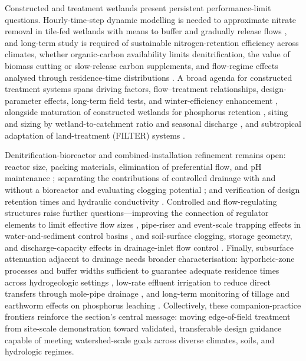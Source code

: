 \documentclass[11pt]{article}
\begin{document}
Constructed and treatment wetlands present persistent performance-limit
questions. Hourly-time-step dynamic modelling is needed to approximate nitrate
removal in tile-fed wetlands with means to buffer and gradually release flows
\parencite{Tanner2011}, and long-term study is required of sustainable
nitrogen-retention efficiency across climates, whether organic-carbon
availability limits denitrification, the value of biomass cutting or slow-release
carbon supplements, and flow-regime effects analysed through residence-time
distributions \parencite{Tanner2005,Tanner2003,Tanner2005b}. A broad agenda for
constructed treatment systems spans driving factors, flow--treatment
relationships, design-parameter effects, long-term field tests, and
winter-efficiency enhancement \parencite{Mendes2021}, alongside maturation of
constructed wetlands for phosphorus retention \parencite{Mendes2020}, siting and
sizing by wetland-to-catchment ratio and seasonal discharge
\parencite{Steidl2019,Tournebize2017}, and subtropical adaptation of
land-treatment (FILTER) systems \parencite{Gardner2001}.

Denitrification-bioreactor and combined-installation refinement remains open:
reactor size, packing materials, elimination of preferential flow, and pH
maintenance \parencite{Aide2016}; separating the contributions of controlled
drainage with and without a bioreactor and evaluating clogging potential
\parencite{Husk2017}; and verification of design retention times and hydraulic
conductivity \parencite{Feyereisen2015}. Controlled and flow-regulating
structures raise further questions---improving the connection of regulator
elements to limit effective flow sizes \parencite{Popek2021}, pipe-riser and
event-scale trapping effects in water-and-sediment control basins
\parencite{Gupta2019}, and soil-surface clogging, storage geometry, and
discharge-capacity effects in drainage-inlet flow control \parencite{Nédélec2010}.
Finally, subsurface attenuation adjacent to drainage needs broader
characterisation: hyporheic-zone processes and buffer widths sufficient to
guarantee adequate residence times across hydrogeologic settings
\parencite{Puckett2005}, low-rate effluent irrigation to reduce direct transfers
through mole-pipe drainage \parencite{Monaghan2007}, and long-term monitoring of
tillage and earthworm effects on phosphorus leaching \parencite{Ulén2018}.
Collectively, these companion-practice frontiers reinforce the section's central
message: moving edge-of-field treatment from site-scale demonstration toward
validated, transferable design guidance capable of meeting watershed-scale goals
across diverse climates, soils, and hydrologic regimes.

\printbibliography
\end{document}

